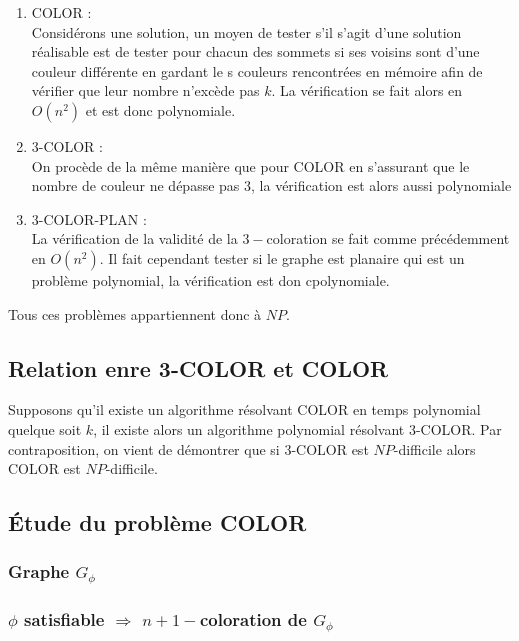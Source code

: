 \begin{enumerate}
	\item COLOR : \\
		Considérons une solution, un moyen de tester s'il s'agit d'une solution réalisable est de tester
		pour chacun des sommets si ses voisins sont d'une couleur différente en gardant le s couleurs
		rencontrées en mémoire afin de vérifier que leur nombre n'excède pas $k$. La vérification se
		fait alors en $O(n^2)$ et est donc polynomiale.
	\item 3-COLOR : \\
		On procède de la même manière que pour COLOR en s'assurant que le nombre de couleur ne dépasse
		pas $3$, la vérification est alors aussi polynomiale
	\item 3-COLOR-PLAN : \\
		La vérification de la validité de la $3-$coloration se fait comme précédemment en $O(n^2)$. Il
			fait cependant tester si le graphe est planaire qui est un problème polynomial, la vérification
			est don cpolynomiale.
	\end{enumerate}

	Tous ces problèmes appartiennent donc à $NP$.

	\subsection{Relation enre 3-COLOR et COLOR}

	Supposons qu'il existe un algorithme résolvant COLOR en temps polynomial quelque soit $k$, il existe
	alors un algorithme polynomial résolvant 3-COLOR. Par contraposition, on vient de démontrer que si
	3-COLOR est $NP$-difficile alors COLOR est $NP$-difficile.

	\subsection{Étude du problème COLOR}

\subsubsection{Graphe $G_{\phi}$}



\subsubsection{$\phi$ satisfiable $\Rightarrow$ $n+1-$coloration de $G_\phi$}


